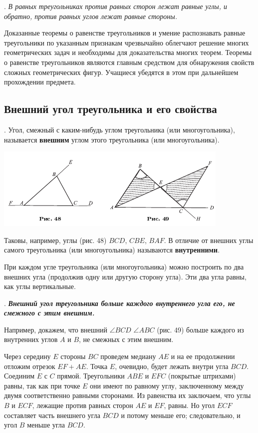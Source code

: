 \documentclass[oneside]{book}
\begin{document}
.
\emph{В равных треугольниках против равных сторон лежат равные углы, и обратно, против равных углов лежат равные стороны.}

Доказанные теоремы о равенстве треугольников и умение распознавать равные треугольники по указанным признакам чрезвычайно облегчают решение многих геометрических задач и необходимы для доказательства многих теорем.
Теоремы о равенстве треугольников являются главным средством для обнаружения свойств сложных геометрических фигур.
Учащиеся убедятся в этом при дальнейшем прохождении предмета.

\subsection*{Внешний угол треугольника и его свойства}

.
Угол, смежный с каким-нибудь углом треугольника (или многоугольника), называется \textbf{внешним} углом этого треугольника (или многоугольника).

\includegraphics{pics/ris-48-49}

Таковы, например, углы (рис. 48) $BCD$, $CBE$, $BAF$.
В отличие от внешних углы самого треугольника (или многоугольника) называются \textbf{внутренними}.

При каждом угле треугольника (или многоугольника) можно построить по два внешних угла (продолжив одну или другую сторону угла).
Эти два угла равны, как углы вертикальные.

.
\textbf{\emph{Внешний угол треугольника больше каждого внутреннего угла его, не смежного с этим внешним.}}

Например, докажем, что внешний $\angle BCD$ $\angle ABC$ %
(рис. 49) больше каждого из внутренних углов $A$ и $B$, не смежных с этим внешним.

Через середину $E$ стороны $BC$ проведем медиану $AE$ и на ее продолжении отложим отрезок $EF+AE$.
Точка $E$, очевидно, будет лежать внутри угла $BCD$.
Соединим $E$ с $C$ прямой.
Треугольники $ABE$ и $EFC$ (покрытые штрихами) равны, так как при точке $E$ они имеют по равному углу, заключенному между двумя соответственно равными сторонами.
Из равенства их заключаем, что углы $B$ и $ECF$, лежащие против равных сторон $AE$ и $EF$, равны.
Но угол $ECF$ составляет часть внешнего угла $BCD$ и потому меньше его;
следовательно, и угол $B$ меньше угла $BCD$.
\end{document}
